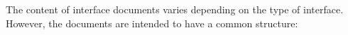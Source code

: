 The content of interface documents varies depending on the type
of interface. However, the documents are intended to have
a common structure: %
\begin{comment}  Too wordy, copied below. Anne
\begin{enumerate}
 \item Definition: This section defines the interfacing systems.
 \item Hardware: In this section, the interfacing hardware components,
   electrical and mechanical, are defined in general terms. As an
   example, the \dword{apa} frame needs to support the \dword{pd}
   mounting brackets.
 \item Design: In this section, the dependencies in design
   methodology, sequence, and standards are described. As with the
   previous example, the design of the \dword{pd} mounting
   brackets depends on side tubes chosen for the \dword{apa}.
 \item Production: Component production and overall assembly is
   shared among interfacing systems. This section details who has what
   responsibilities.
 \item Testing: Like production, testing is a shared
   responsibility. In this section, responsibilities for testing and
   the required equipment are apportioned.
 \item Integration: The integration of systems into installable units
   before insertion into the cryostat is defined in this section. The
   location, methodology, tooling, and environment for integration are
   defined.
 \item Installation: Installation tasks and responsibilities, once
   installable units are assembled, are defined in this section. Any
   special transportation or installation tool or fixture is also
   defined.
 \item Commissioning: In this section, overall responsibilities for
   commissioning tasks are defined, and parameters are set.
 \item Appendices: Technical figures and interfaces should be included
   in this section in as much detail as necessary. Block diagrams that
   show interconnections and detailed documentation of each connection
   are needed.
\end{enumerate}
\end{comment}
